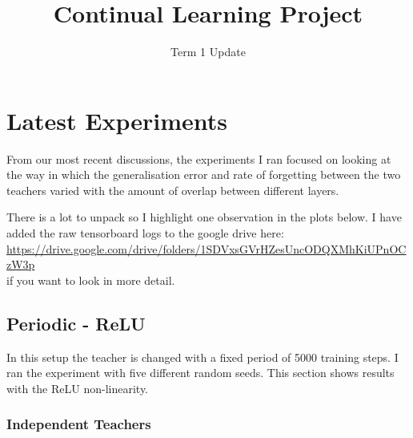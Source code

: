 \documentclass{article}
\begin{document}
	\title{Continual Learning Project}
	
	\author{Term 1 Update}
	
	\maketitle

\section{Latest Experiments}
    
From our most recent discussions, the experiments I ran focused on looking 
at the way in which the generalisation error and rate of forgetting between 
the two teachers varied with the amount of overlap between different layers. 

There is a lot to unpack so I highlight one observation in the plots below. 
I have added the raw tensorboard logs to the google drive here:\\ 

\href{https://drive.google.com/drive/folders/1SDVxsGVrHZesUncODQXMhKiUPnOCzW3p}{https://drive.google.com/drive/folders/1SDVxsGVrHZesUncODQXMhKiUPnOCzW3p}\\

\noindent if you want to look in more detail. 

\subsection{Periodic - ReLU}

In this setup the teacher is changed with a fixed period of 5000 training steps. 
I ran the experiment with five different random seeds. This section shows results with the ReLU non-linearity.

\subsubsection{Independent Teachers}
\end{document}
